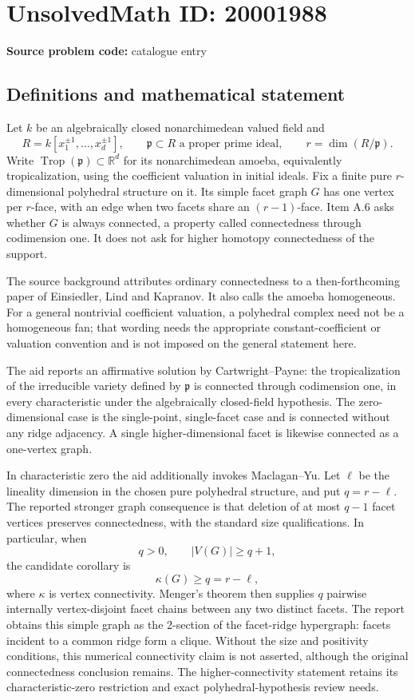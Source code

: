 \documentclass[11pt]{article}
\begin{document}
\section*{UnsolvedMath ID: 20001988}
\textbf{Source problem code:} catalogue entry
\subsection{Definitions and mathematical statement}
Let \(k\) be an algebraically closed nonarchimedean valued field and
\[
 R=k[x_1^{\pm1},\ldots,x_d^{\pm1}],\qquad
 \mathfrak p\subset R\text{ a proper prime ideal},\qquad
 r=\dim(R/\mathfrak p).
\]
Write \(\operatorname{Trop}(\mathfrak p)\subset\mathbb R^d\) for its nonarchimedean amoeba, equivalently tropicalization, using the coefficient valuation in initial ideals. Fix a finite pure \(r\)-dimensional polyhedral structure on it. Its simple facet graph \(G\) has one vertex per \(r\)-face, with an edge when two facets share an \((r-1)\)-face. Item A.6 asks whether \(G\) is always connected, a property called connectedness through codimension one. It does not ask for higher homotopy connectedness of the support.

The source background attributes ordinary connectedness to a then-forthcoming paper of Einsiedler, Lind and Kapranov. It also calls the amoeba homogeneous. For a general nontrivial coefficient valuation, a polyhedral complex need not be a homogeneous fan; that wording needs the appropriate constant-coefficient or valuation convention and is not imposed on the general statement here.

The aid reports an affirmative solution by Cartwright--Payne: the tropicalization of the irreducible variety defined by \(\mathfrak p\) is connected through codimension one, in every characteristic under the algebraically closed-field hypothesis. The zero-dimensional case is the single-point, single-facet case and is connected without any ridge adjacency. A single higher-dimensional facet is likewise connected as a one-vertex graph.

In characteristic zero the aid additionally invokes Maclagan--Yu. Let \(\ell\) be the lineality dimension in the chosen pure polyhedral structure, and put \(q=r-\ell\). The reported stronger graph consequence is that deletion of at most \(q-1\) facet vertices preserves connectedness, with the standard size qualifications. In particular, when
\[
 q>0,\qquad |V(G)|\geq q+1,
\]
the candidate corollary is
\[
 \kappa(G)\geq q=r-\ell,
\]
where \(\kappa\) is vertex connectivity. Menger's theorem then supplies \(q\) pairwise internally vertex-disjoint facet chains between any two distinct facets. The report obtains this simple graph as the 2-section of the facet-ridge hypergraph: facets incident to a common ridge form a clique. Without the size and positivity conditions, this numerical connectivity claim is not asserted, although the original connectedness conclusion remains. The higher-connectivity statement retains its characteristic-zero restriction and exact polyhedral-hypothesis review needs.
\end{document}
